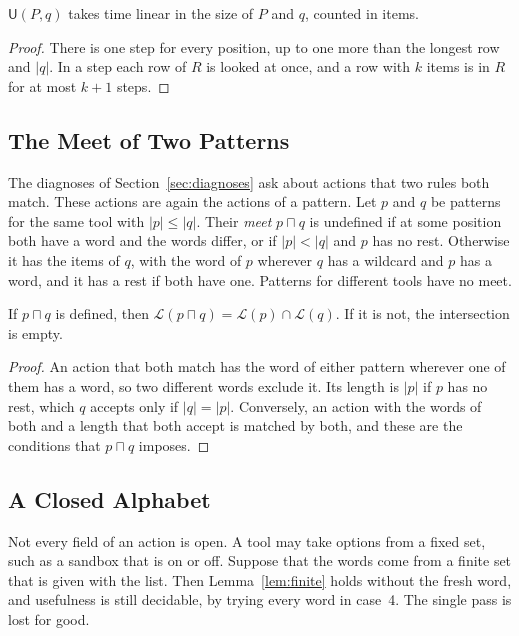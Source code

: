 \documentclass[acmsmall,nonacm,screen]{acmart}
\newcommand{\kw}[1]{\mathsf{#1}}
\newcommand{\lang}[1]{\mathcal{L}(#1)}
\newcommand{\U}{\kw{U}}
\newcommand{\meet}{\sqcap}
\begin{document}
\begin{theorem}\label{thm:cost}
$\U(P, q)$ takes time linear in the size of $P$ and $q$, counted in items.
\end{theorem}

\begin{proof}
There is one step for every position, up to one more than the longest row and $|q|$. In a
step each row of $R$ is looked at once, and a row with $k$ items is in $R$ for at most $k +
1$ steps.
\end{proof}

\subsection{The Meet of Two Patterns}

The diagnoses of Section~\ref{sec:diagnoses} ask about actions that two rules both match.
These actions are again the actions of a pattern. Let $p$ and $q$ be patterns for the same
tool with $|p| \le |q|$. Their \emph{meet} $p \meet q$ is undefined if at some position both
have a word and the words differ, or if $|p| < |q|$ and $p$ has no rest. Otherwise it has the
items of $q$, with the word of $p$ wherever $q$ has a wildcard and $p$ has a word, and it has
a rest if both have one. Patterns for different tools have no meet.

\begin{lemma}[Meet]\label{lem:meet}
If $p \meet q$ is defined, then $\lang{p \meet q} = \lang{p} \cap \lang{q}$. If it is not,
the intersection is empty.
\end{lemma}

\begin{proof}
An action that both match has the word of either pattern wherever one of them has a word, so
two different words exclude it. Its length is $|p|$ if $p$ has no rest, which $q$ accepts
only if $|q| = |p|$. Conversely, an action with the words of both and a length that both
accept is matched by both, and these are the conditions that $p \meet q$ imposes.
\end{proof}

\subsection{A Closed Alphabet}

Not every field of an action is open. A tool may take options from a fixed set, such as a
sandbox that is on or off. Suppose that the words come from a finite set that is given with
the list. Then Lemma~\ref{lem:finite} holds without the fresh word, and usefulness is still
decidable, by trying every word in case~4. The single pass is lost for good.
\end{document}
